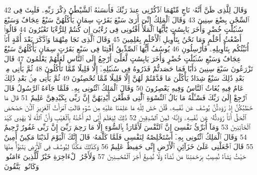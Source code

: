 {\tiny\colorbox{cl_aya}{42}} وَقَالَ لِلَّذِى ظَنَّ أَنَّهُۥ نَاجٍ مِّنْهُمَا ٱذْكُرْنِى عِندَ رَبِّكَ فَأَنسَىٰهُ ٱلشَّيْطَٰنُ ذِكْرَ رَبِّهِۦ فَلَبِثَ فِى ٱلسِّجْنِ بِضْعَ سِنِينَ
{\tiny\colorbox{cl_aya}{43}} وَقَالَ ٱلْمَلِكُ إِنِّىٓ أَرَىٰ سَبْعَ بَقَرَٰتٍ سِمَانٍ يَأْكُلُهُنَّ سَبْعٌ عِجَافٌ وَسَبْعَ سُنۢبُلَٰتٍ خُضْرٍ وَأُخَرَ يَابِسَٰتٍ يَٰٓأَيُّهَا ٱلْمَلَأُ أَفْتُونِى فِى رُءْيَٰىَ إِن كُنتُمْ لِلرُّءْيَا تَعْبُرُونَ
{\tiny\colorbox{cl_aya}{44}} قَالُوٓا۟ أَضْغَٰثُ أَحْلَٰمٍ وَمَا نَحْنُ بِتَأْوِيلِ ٱلْأَحْلَٰمِ بِعَٰلِمِينَ
{\tiny\colorbox{cl_aya}{45}} وَقَالَ ٱلَّذِى نَجَا مِنْهُمَا وَٱدَّكَرَ بَعْدَ أُمَّةٍ أَنَا۠ أُنَبِّئُكُم بِتَأْوِيلِهِۦ فَأَرْسِلُونِ
{\tiny\colorbox{cl_aya}{46}} يُوسُفُ أَيُّهَا ٱلصِّدِّيقُ أَفْتِنَا فِى سَبْعِ بَقَرَٰتٍ سِمَانٍ يَأْكُلُهُنَّ سَبْعٌ عِجَافٌ وَسَبْعِ سُنۢبُلَٰتٍ خُضْرٍ وَأُخَرَ يَابِسَٰتٍ لَّعَلِّىٓ أَرْجِعُ إِلَى ٱلنَّاسِ لَعَلَّهُمْ يَعْلَمُونَ
{\tiny\colorbox{cl_aya}{47}} قَالَ تَزْرَعُونَ سَبْعَ سِنِينَ دَأَبًا فَمَا حَصَدتُّمْ فَذَرُوهُ فِى سُنۢبُلِهِۦٓ إِلَّا قَلِيلًا مِّمَّا تَأْكُلُونَ
{\tiny\colorbox{cl_aya}{48}} ثُمَّ يَأْتِى مِنۢ بَعْدِ ذَٰلِكَ سَبْعٌ شِدَادٌ يَأْكُلْنَ مَا قَدَّمْتُمْ لَهُنَّ إِلَّا قَلِيلًا مِّمَّا تُحْصِنُونَ
{\tiny\colorbox{cl_aya}{49}} ثُمَّ يَأْتِى مِنۢ بَعْدِ ذَٰلِكَ عَامٌ فِيهِ يُغَاثُ ٱلنَّاسُ وَفِيهِ يَعْصِرُونَ
{\tiny\colorbox{cl_aya}{50}} وَقَالَ ٱلْمَلِكُ ٱئْتُونِى بِهِۦ فَلَمَّا جَآءَهُ ٱلرَّسُولُ قَالَ ٱرْجِعْ إِلَىٰ رَبِّكَ فَسْـَٔلْهُ مَا بَالُ ٱلنِّسْوَةِ ٱلَّٰتِى قَطَّعْنَ أَيْدِيَهُنَّ إِنَّ رَبِّى بِكَيْدِهِنَّ عَلِيمٌ
{\tiny\colorbox{cl_aya}{51}} قَالَ مَا خَطْبُكُنَّ إِذْ رَٰوَدتُّنَّ يُوسُفَ عَن نَّفْسِهِۦ قُلْنَ حَٰشَ لِلَّهِ مَا عَلِمْنَا عَلَيْهِ مِن سُوٓءٍ قَالَتِ ٱمْرَأَتُ ٱلْعَزِيزِ ٱلْـَٰٔنَ حَصْحَصَ ٱلْحَقُّ أَنَا۠ رَٰوَدتُّهُۥ عَن نَّفْسِهِۦ وَإِنَّهُۥ لَمِنَ ٱلصَّٰدِقِينَ
{\tiny\colorbox{cl_aya}{52}} ذَٰلِكَ لِيَعْلَمَ أَنِّى لَمْ أَخُنْهُ بِٱلْغَيْبِ وَأَنَّ ٱللَّهَ لَا يَهْدِى كَيْدَ ٱلْخَآئِنِينَ
{\tiny\colorbox{cl_aya}{53}} وَمَآ أُبَرِّئُ نَفْسِىٓ إِنَّ ٱلنَّفْسَ لَأَمَّارَةٌۢ بِٱلسُّوٓءِ إِلَّا مَا رَحِمَ رَبِّىٓ إِنَّ رَبِّى غَفُورٌ رَّحِيمٌ
{\tiny\colorbox{cl_aya}{54}} وَقَالَ ٱلْمَلِكُ ٱئْتُونِى بِهِۦٓ أَسْتَخْلِصْهُ لِنَفْسِى فَلَمَّا كَلَّمَهُۥ قَالَ إِنَّكَ ٱلْيَوْمَ لَدَيْنَا مَكِينٌ أَمِينٌ
{\tiny\colorbox{cl_aya}{55}} قَالَ ٱجْعَلْنِى عَلَىٰ خَزَآئِنِ ٱلْأَرْضِ إِنِّى حَفِيظٌ عَلِيمٌ
{\tiny\colorbox{cl_aya}{56}} وَكَذَٰلِكَ مَكَّنَّا لِيُوسُفَ فِى ٱلْأَرْضِ يَتَبَوَّأُ مِنْهَا حَيْثُ يَشَآءُ نُصِيبُ بِرَحْمَتِنَا مَن نَّشَآءُ وَلَا نُضِيعُ أَجْرَ ٱلْمُحْسِنِينَ
{\tiny\colorbox{cl_aya}{57}} وَلَأَجْرُ ٱلْءَاخِرَةِ خَيْرٌ لِّلَّذِينَ ءَامَنُوا۟ وَكَانُوا۟ يَتَّقُونَ
